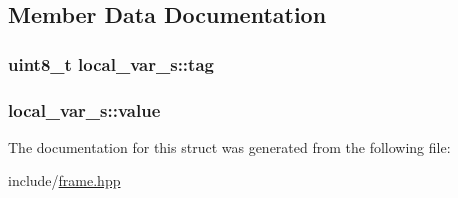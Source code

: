 \subsection{Member Data Documentation}
\hypertarget{structlocal__var__s_ab6da81466316f0fcec86450b154b2278}{
\subsubsection[{tag}]{\setlength{\rightskip}{0pt plus 5cm}uint8\+\_\+t local\+\_\+var\+\_\+s\+::tag}}\label{structlocal__var__s_ab6da81466316f0fcec86450b154b2278}
\hypertarget{structlocal__var__s_a5f2837a0cc5caf9a0b74f2f8745a0164}{
\subsubsection[{value}]{ local\+\_\+var\+\_\+s\+::value}}\label{structlocal__var__s_a5f2837a0cc5caf9a0b74f2f8745a0164}


The documentation for this struct was generated from the following file\+:\begin{DoxyCompactItemize}
\item 
include/\hyperlink{frame_8hpp}{frame.\+hpp}\end{DoxyCompactItemize}
